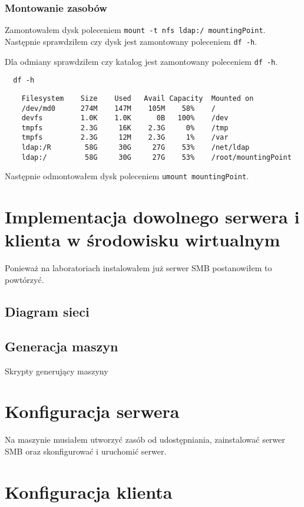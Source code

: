 \documentclass{article} %
\begin{document}
\subsubsection{Montowanie zasobów}
Zamontowałem dysk poleceniem \texttt{mount -t nfs ldap:/ mountingPoint}. Następnie sprawdziłem czy dysk jest zamontowany poleceniem \texttt{df -h}.

Dla odmiany sprawdziłem czy katalog jest zamontowany poleceniem \texttt{df -h}.
\begin{tcolorbox}[colback=yellow!10!white,colframe=red!45!black,coltitle=yellow!100!black, title=FreeBSD]
  \begin{lstlisting}
  df -h
  \end{lstlisting}
  \tcblower
  \tiny
  \begin{lstlisting}
    Filesystem    Size    Used   Avail Capacity  Mounted on
    /dev/md0      274M    147M    105M    58%    /
    devfs         1.0K    1.0K      0B   100%    /dev
    tmpfs         2.3G     16K    2.3G     0%    /tmp
    tmpfs         2.3G     12M    2.3G     1%    /var
    ldap:/R        58G     30G     27G    53%    /net/ldap
    ldap:/         58G     30G     27G    53%    /root/mountingPoint 
  \end{lstlisting}
\end{tcolorbox}
\normalsize

Następnie odmontowałem dysk poleceniem \texttt{umount mountingPoint}.

\section{Implementacja dowolnego serwera i klienta w środowisku wirtualnym}
Ponieważ na laboratoriach instalowałem już serwer SMB postanowiłem to powtórzyć.

\subsection{Diagram sieci}

\subsection{Generacja maszyn}
Skrypty generujący maszyny




\section{Konfiguracja serwera}
Na maszynie musiałem utworzyć zasób od udostępniania, zainstalować serwer SMB oraz skonfigurować i uruchomić serwer.



\section{Konfiguracja klienta}
\end{document}
